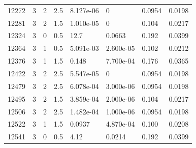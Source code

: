 \documentclass[preview]{standalone}
\begin{document}
{{{{{{\begin{tabular}{L{1.2cm}C{1.2cm} C{0.3cm}C{0.5cm} C{1.4cm}C{1.4cm} C{1.4cm}C{1.4cm}}
  12272  &     3  & 2     & 2.5 &  8.127e-06  & 0  & 0.0954 &  0.0198   \\ 
  12281  &     3  & 2     & 1.5 &  1.010e-05  & 0  & 0.104 &  0.0217   \\ 
  12324  &     3  & 0     & 0.5 &  12.7  & 0.0663  & 0.192 &  0.0399   \\ 
  12364  &     3  & 1     & 0.5 &  5.091e-03  & 2.600e-05  & 0.102 &  0.0212   \\ 
  12376  &     3  & 1     & 1.5 &  0.148  & 7.700e-04  & 0.176 &  0.0365   \\ 
  12422  &     3  & 2     & 2.5 &  5.547e-05  & 0  & 0.0954 &  0.0198   \\ 
  12479  &     3  & 2     & 2.5 &  6.078e-04  & 3.000e-06  & 0.0954 &  0.0198   \\ 
  12495  &     3  & 2     & 1.5 &  3.859e-04  & 2.000e-06  & 0.104 &  0.0217   \\ 
  12506  &     3  & 2     & 2.5 &  1.482e-04  & 1.000e-06  & 0.0954 &  0.0198   \\ 
  12522  &     3  & 1     & 1.5 &  0.0937  & 4.870e-04  & 0.100 &  0.0208   \\ 
  12541  &     3  & 0     & 0.5 &  4.12  & 0.0214  & 0.192 &  0.0399   \\ 
\hline 
\end{tabular} 

}}}}}}
\end{document}
